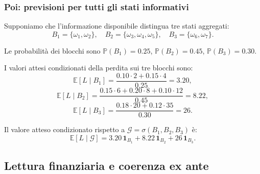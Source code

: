 \documentclass[handout]{beamer}%
\providecommand{\E}{\mathbb{E}}
\providecommand{\Prob}{\mathbb{P}}
\providecommand{\G}{\mathcal{G}}
\providecommand{\1}{\mathbf{1}}
\providecommand{\QTR}[2]{\csname #1\endcsname{#2}}
\begin{document}
\begin{frame}%
%

\frametitle{Poi: previsioni per tutti gli stati informativi}%
%

%


Supponiamo che l'informazione disponibile distingua tre stati aggregati:
\[
B_{1} = \{\omega_{1},\omega_{2}\}, \quad B_{2} = \{\omega_{3},\omega
_{4},\omega_{5}\}, \quad B_{3} = \{\omega_{6},\omega_{7}\}.
\]


Le probabilit\`{a} dei blocchi sono $\Prob(B_{1})=0.25$, $\Prob(B_{2})=0.45$,
$\Prob(B_{3})=0.30$.

\medskip

I valori attesi condizionati della perdita sui tre blocchi sono:
\[
\E[L\mid B_1] = \frac{0.10\cdot2+0.15\cdot4}{0.25} = 3.20,
\]
\[
\E[L\mid B_2] = \frac{0.15\cdot6+0.20\cdot8+0.10\cdot12}{0.45} = 8.22,
\]
\[
\E[L\mid B_3] = \frac{0.18\cdot20+0.12\cdot35}{0.30} = 26.
\]


Il valore atteso condizionato rispetto a $\G = \sigma(B_{1},B_{2},B_{3})$
\`{e}:
\[
\E[L\mid\G] = 3.20\,\1_{B_{1}} + 8.22\,\1_{B_{2}} + 26\,\1_{B_{3}}.
\]
%

\transboxout
\end{frame}%


\subsection{Lettura finanziaria e coerenza ex ante}%
\end{document}
